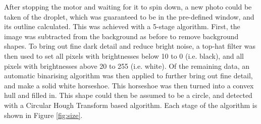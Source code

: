 \documentclass{physics_article_B}
\begin{document}
            After stopping the motor and waiting for it to spin down, a new photo could be taken of the droplet, which was guaranteed to be in the pre-defined window, and its outline calculated. This was achieved with a 5-stage algorithm. First, the image was subtracted from the background as before to remove background shapes. To bring out fine dark detail and reduce bright noise, a top-hat filter was then used to set all pixels with brightnesses below 10 to 0 (i.e. black), and all pixels with brightnesses above 20 to 255 (i.e. white). Of the remaining data, an automatic binarising algorithm was then applied to further bring out fine detail, and make a solid white horseshoe. This horseshoe was then turned into a convex hull and filled in. This shape could then be assumed to be a circle, and detected with a Circular Hough Transform based algorithm\cite{imfindcircles}. Each stage of the algorithm is shown in Figure \ref{fig:size}.
            
\end{document}

